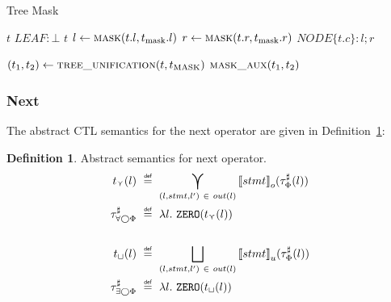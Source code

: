 \documentclass[11pt,a4paper,titlepage]{article}
\theoremstyle{definition}
\newtheorem{definition}{Definition}[section]
\newcommand\eqdef{\mathrel{\overset{\makebox[0pt]{\mbox{\normalfont\tiny\sffamily def}}}{=}}}
\begin{document}
\begin{algorithm}[t]
    \caption{Tree Mask}         
    \label{alg:tree_mask}       
    \begin{algorithmic}

                    \State \Return $t$
                        \State \Return $LEAF: \bot$
                    \Else
                        \State \Return $t$
                    \EndIf
                \Else
                    \State $l \gets \Call{mask}{t.l, t_{\text{mask}}.l}$
                    \State $r \gets \Call{mask}{t.r, t_{\text{mask}}.r}$
                    \State \Return $NODE\{t.c \}: l ; r$
                \EndIf 
            \EndFunction

            \State $(t_1, t_2) \gets \Call{tree\_unification}{t, t_{\text{MASK}}}$
            \State \Return $\Call{mask\_aux}{t_1, t_2}$
        \EndFunction
\end{algorithmic}
\end{algorithm}



\subsubsection*{Next}
The abstract CTL semantics for the \textsf{next} operator are given in Definition~\ref{def:abstract_next_semantics}: 

\begin{definition}\label{def:abstract_next_semantics}
    Abstract semantics for \textsf{next} operator.
    \setlength{\jot}{15pt}
    \begin{align*}
        t_{\curlyvee}(l) \ &\eqdef \  
        \bigcurlyvee\limits_{(l, stmt, l') \ \in \ out(l) } {\llbracket stmt \rrbracket}_{o}(\tau^\sharp_\Phi(l)) \\
        \tau^\sharp_{\forall\bigcirc\Phi} \ &\eqdef \ \lambda l. \ \mathtt{ZERO}(t_{\curlyvee}(l))\\\\
        t_{\sqcup}(l) \ &\eqdef \  
        \bigsqcup\limits_{(l, stmt, l') \ \in \ out(l) } {\llbracket stmt \rrbracket}_{u}(\tau^\sharp_\Phi(l)) \\
        \tau^\sharp_{\exists\bigcirc\Phi} \ &\eqdef \ \lambda l. \ \mathtt{ZERO}(t_{\sqcup}(l))\\
    \end{align*}
\end{definition}
\end{document}
